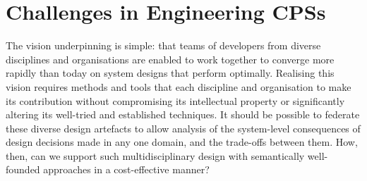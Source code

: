 \section{Challenges in Engineering CPSs}\label{sec:challenges}


The vision underpinning \into is simple: that teams of developers from diverse disciplines and organisations are enabled to work together to converge more rapidly than today on system designs that perform optimally. Realising this vision requires methods and tools that each discipline and organisation to make its contribution without compromising its intellectual property or significantly altering its well-tried and established techniques. It should be possible to federate these diverse design artefacts to allow analysis of the system-level consequences of design decisions made in any one domain, and the trade-offs between them. How, then, can we support such multidisciplinary design with semantically well-founded approaches in a cost-effective manner? 

